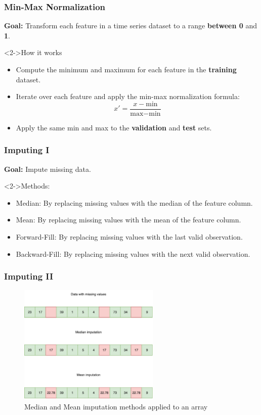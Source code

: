 \documentclass[t,english]{beamer}
\begin{document}
\begin{frame}
  \frametitle{Min-Max Normalization}
  \textbf{Goal:} Transform each feature in a time series dataset to a range \textbf{between 0} and \textbf{1}.

  \begin{block}<2->{How it works}
    \begin{itemize}
      \item<2-> Compute the minimum and maximum for each feature in the \textbf{training} dataset.
      \item<3-> Iterate over each feature and apply the min-max normalization formula:
            \begin{equation}
              x' = \frac{x - \text{min}}{\text{max} - \text{min}}
            \end{equation}
      \item<4-> Apply the same min and max to the \textbf{validation} and \textbf{test} sets.
    \end{itemize}
  \end{block}
\end{frame}

\begin{frame}
  \frametitle{Imputing I}
  \textbf{Goal:} Impute missing data.

  \begin{block}<2->{Methods:}
    \begin{itemize}
      \item<2-> Median: By replacing missing values with the median of the feature column.
      \item <3-> Mean: By replacing missing values with the mean of the feature column.
      \item <4-> Forward-Fill: By replacing missing values with the last valid observation.
      \item <5-> Backward-Fill: By replacing missing values with the next valid observation.
    \end{itemize}
  \end{block}
\end{frame}

\begin{frame}
  \frametitle{Imputing II}
    \begin{figure}[H]
        \includegraphics[width=0.6\textwidth]{figures/imputing/imputation_1.png}
        \caption{Median and Mean imputation methods applied to an array}
        \label{fig:imputing}
    \end{figure}
\end{frame}
\end{document}
